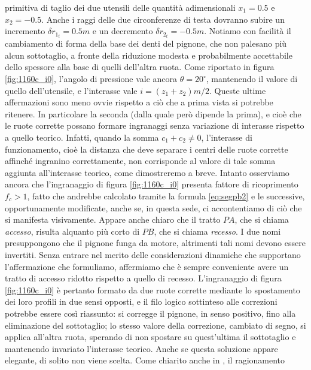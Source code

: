 primitiva di taglio dei due 
utensili delle quantit\`a adimensionali $x_1=0.5$ e $x_2=-0.5$. Anche i raggi
delle due circonferenze di testa dovranno subire
un incremento $\delta r_{1_t}=0.5 m$
e un decremento  $\delta r_{2_t}=-0.5 m$. 
Notiamo con facilit\`a il cambiamento di forma della base dei denti del 
pignone, che non palesano pi\`u alcun sottotaglio, a fronte della riduzione
modesta e
probabilmente accettabile dello spessore alla base di quelli dell'altra ruota.
Come riportato in figura \ref{fig:1160c_i0},
l'angolo di pressione vale ancora $\theta=20^{\circ}$, mantenendo 
il valore di quello dell'utensile, e l'interasse vale $i=(z_1+z_2)m/2$.
Queste ultime affermazioni sono meno ovvie
rispetto a ci\`o che a prima vista si potrebbe ritenere. In particolare
la seconda (dalla quale per\`o dipende la prima), e cio\`e che le ruote
corrette possano formare ingranaggi senza variazione di interasse rispetto
a quello teorico.
Infatti, quando la somma $c_1+c_2 \ne 0$, l'interasse di funzionamento,
cio\`e la distanza che deve separare i centri delle ruote corrette affinch\'e
ingranino correttamente, non corrisponde al valore di tale somma aggiunta
all'interasse teorico, come dimostreremo a breve. 
Intanto osserviamo ancora che l'ingranaggio di figura \ref{fig:1160c_i0} presenta
fattore di ricoprimento $f_c > 1$, fatto che andrebbe calcolato tramite
la formula \ref{eq:segpb2} e le successive, opportunamente modificate, anche se,
in questa sede, ci accontentiamo di ci\`o che si manifesta visivamente. Appare
anche chiaro che il tratto $PA$, che si chiama {\em accesso},
risulta alquanto pi\`u corto di $PB$, che si chiama {\em recesso}.
I due nomi
presuppongono che il pignone funga da motore, altrimenti tali nomi devono essere
invertiti. Senza entrare nel merito delle considerazioni dinamiche che
supportano l'affermazione che formuliamo, affermiamo che \`e sempre conveniente
avere un tratto di accesso ridotto rispetto a quello di recesso.
L'ingranaggio di figura \ref{fig:1160c_i0} \`e pertanto formato da due ruote
corrette mediante lo spostamento dei loro profili in due sensi opposti,
e il filo logico sottinteso alle correzioni
potrebbe essere cos\`i riassunto: si corregge il pignone, in senso positivo, 
fino alla eliminazione del sottotaglio; lo stesso valore della correzione,
cambiato di segno, si applica all'altra ruota, sperando di non spostare su
quest'ultima il sottotaglio e mantenendo invariato l'interasse teorico.
Anche se questa soluzione appare elegante, di solito non viene scelta.
Come chiarito anche in \cite{righettini}, il ragionamento 
